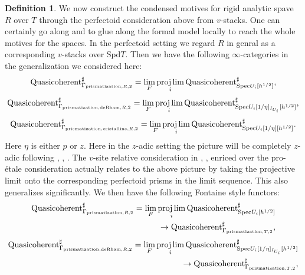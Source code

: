 \documentclass[12pt]{article}
\theoremstyle{definition}
\newtheorem{definition}{Definition}
\begin{document}
\begin{definition}
We now construct the condensed motives for rigid analytic spave $R$ over $T$ through the perfectoid consideration above from $v$-stacks. One can certainly go along \cite{SchI} and \cite{ALBRCS} to glue along the formal model locally to reach the whole motives for the spaces. In the perfectoid setting we regard $R$ in genral as a corresponding $v$-stacks over $\mathrm{Spd}T$. Then we have the following $\infty$-categories in the generalization we considered here:
\begin{align}
\mathrm{Quasicoherent}^\sharp_{\mathrm{\Gamma}_{\mathrm{prismatization},R,2}}=\lim_{F}\projlim_i \mathrm{Quasicoherent}^\sharp_{\mathrm{Spec}U_i[h^{1/2}]},
\end{align}
\begin{align}
\mathrm{Quasicoherent}^\sharp_{\mathrm{\Gamma}_{\mathrm{prismatization},\mathrm{deRham},R,2}}=\lim_{F}\projlim_i \mathrm{Quasicoherent}^\sharp_{\mathrm{Spec}U_i[1/\eta]_{I_{U_i}}[h^{1/2}]},
\end{align}
\begin{align}
\mathrm{Quasicoherent}^\sharp_{\mathrm{\Gamma}_{\mathrm{prismatization},\mathrm{cristalline},R,2}}=\lim_{F}\projlim_i \mathrm{Quasicoherent}^\sharp_{\mathrm{Spec}U_i[1/\eta][h^{1/2}]}.
\end{align}
Here $\eta$ is either $p$ or $z$. Here in the $z$-adic setting the picture will be completely $z$-adic following \cite{SchIV}, \cite{KLI}, \cite{KLII}. The $v$-site relative consideration in \cite{SchIV}, \cite{KLI}, \cite{KLII} enriced over the pro-\'etale consideration actually relates to the above picture by taking the projective limit onto the corresponding perfectoid prisms in the limit sequence. This also generalizes \cite{TIV} significantly. We then have the following Fontaine style functors:
\begin{align}
\mathrm{Quasicoherent}^\sharp_{\mathrm{\Gamma}_{\mathrm{prismatization},R,2}}=\lim_{F}\projlim_i \mathrm{Quasicoherent}^\sharp_{\mathrm{Spec}U_i[h^{1/2}]}\\\rightarrow \mathrm{Quasicoherent}^\sharp_{\mathrm{\Gamma}_{\mathrm{prismatization},T,2}},
\end{align}
\begin{align}
\mathrm{Quasicoherent}^\sharp_{\mathrm{\Gamma}_{\mathrm{prismatization},\mathrm{deRham},R,2}}=\lim_{F}\projlim_i \mathrm{Quasicoherent}^\sharp_{\mathrm{Spec}U_i[1/\eta]_{I_{U_i}}[h^{1/2}]}\\
\rightarrow \mathrm{Quasicoherent}^\sharp_{\mathrm{\Gamma}_{\mathrm{prismatization},T,2}},

\end{align}
\end{definition}
\end{document}
